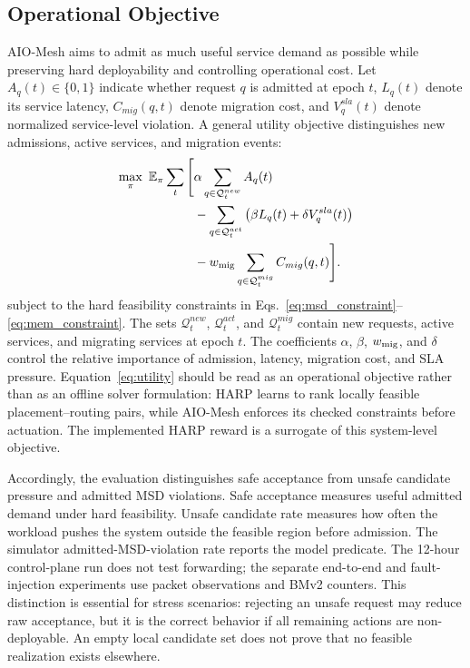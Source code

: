 \documentclass[final,5p]{elsarticle}
\newcommand{\rev}[1]{\textcolor{revisiongreen}{#1}}
\let\newrev\rev
\begin{document}
\subsection{Operational Objective}
\label{subsec:objective_metrics}

AIO-Mesh aims to admit as much useful service demand as possible while preserving hard deployability and controlling operational cost. Let \(A_q(t)\in\{0,1\}\) indicate whether request \(q\) is admitted at epoch \(t\), \(L_q(t)\) denote its service latency, \(C_{mig}(q,t)\) denote migration cost, and \(V_q^{sla}(t)\) denote normalized service-level violation. \rev{A general utility objective distinguishes new admissions, active services, and migration events:}
\begin{equation}
\rev{\begin{aligned}
\max_{\pi}\ \mathbb{E}_{\pi}\sum_t\Bigg[
&\alpha\sum_{q\in\mathcal{Q}_t^{new}}A_q(t)\\
&-\sum_{q\in\mathcal{Q}_t^{act}}\big(\beta L_q(t)+\delta V_q^{sla}(t)\big)\\
&-w_{\rm mig}\sum_{q\in\mathcal{Q}_t^{mig}}C_{mig}(q,t)
\Bigg].
\end{aligned}}
\label{eq:utility}
\end{equation}
subject to the hard feasibility constraints in Eqs.~\eqref{eq:msd_constraint}--\eqref{eq:mem_constraint}. \newrev{The sets \(\mathcal{Q}_t^{new}\), \(\mathcal{Q}_t^{act}\), and \(\mathcal{Q}_t^{mig}\) contain new requests, active services, and migrating services at epoch \(t\).} The coefficients \(\alpha\), \(\beta\), \(w_{\rm mig}\), and \(\delta\) control the relative importance of admission, latency, migration cost, and SLA pressure. Equation~\eqref{eq:utility} should be read as an operational objective rather than as an offline solver formulation: HARP learns to rank \rev{locally feasible placement--routing pairs}, while AIO-Mesh enforces \rev{its checked constraints} before actuation. \rev{The implemented HARP reward is a surrogate of this system-level objective.}

Accordingly, the evaluation distinguishes safe acceptance from unsafe candidate pressure and admitted MSD violations. Safe acceptance measures useful admitted demand under hard feasibility. Unsafe candidate rate measures how often the workload pushes the system outside the feasible region before admission. \newrev{The simulator admitted-MSD-violation rate reports the model predicate. The 12-hour control-plane run does not test forwarding; the separate end-to-end and fault-injection experiments use packet observations and BMv2 counters.} This distinction is essential for stress scenarios: rejecting an unsafe request may reduce raw acceptance, but it is the correct behavior if all remaining actions are non-deployable. \rev{An empty local candidate set does not prove that no feasible realization exists elsewhere.}
\end{document}
